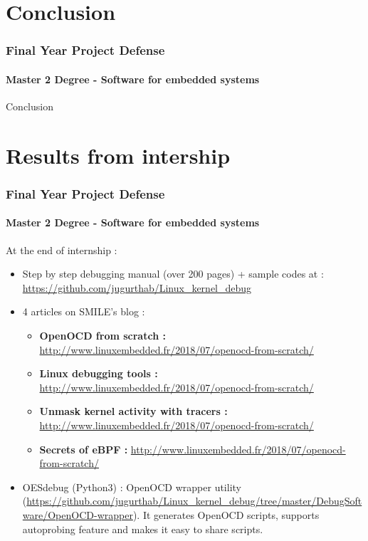 \documentclass[11pt]{beamer}
\newcommand\Fontvi{\fontsize{6}{7.2}\selectfont}
\begin{document}
\section{Conclusion}

    \begin{frame}
\frametitle{Final Year Project Defense}

\framesubtitle{Master 2 Degree - Software for embedded systems}
    Conclusion

    \end{frame}

    
    
\section{Results from intership}

    \begin{frame}
\frametitle{Final Year Project Defense}

\framesubtitle{Master 2 Degree - Software for embedded systems}
    At the end of internship :
    \begin{itemize}
    	\item Step by step debugging manual (over 200 pages) + sample codes at : {\color{blue} \url{https://github.com/jugurthab/Linux_kernel_debug}}
    	 
    	 \item {4 articles on SMILE's blog : }
    	 \begin{itemize}
    	    \Fontvi
    	 	\item \textbf{OpenOCD from scratch : } {\color{blue}\url{http://www.linuxembedded.fr/2018/07/openocd-from-scratch/}}

    	 	\item \textbf{Linux debugging tools : } {\color{blue}\url{http://www.linuxembedded.fr/2018/07/openocd-from-scratch/}}
    	 	
    	 	\item \textbf{Unmask kernel activity with tracers : } {\color{blue}\url{http://www.linuxembedded.fr/2018/07/openocd-from-scratch/}}    	 	
    	 	\item \textbf{Secrets of eBPF  : } {\color{blue}\url{http://www.linuxembedded.fr/2018/07/openocd-from-scratch/}}
    	 \end{itemize}
    	 
    	 
    	 \item OESdebug (Python3) : OpenOCD wrapper utility ({\color{blue}\url{https://github.com/jugurthab/Linux_kernel_debug/tree/master/DebugSoftware/OpenOCD-wrapper}}). 
    	  \Fontvi
    	 It generates OpenOCD scripts, supports autoprobing feature and makes it easy to share scripts.
    \end{itemize}

    \end{frame}
    
    
\end{document}
